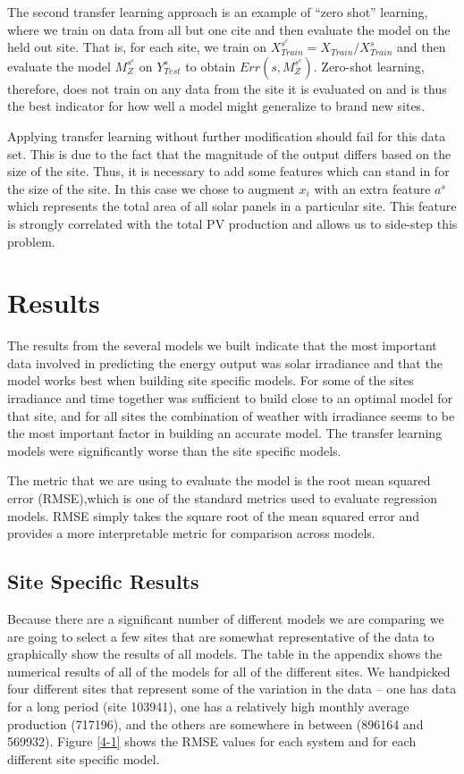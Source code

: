 \documentclass[11pt, fullpage,letterpaper]{article}
\begin{document}
The second transfer learning approach is an example of “zero shot” learning, where we train on data from all but one cite and then evaluate the model on the held out site. That is, for each site, we train on $X^{s^c}_{Train} = X_{Train} / X^s_{Train}$ and then evaluate the model $M^{s^c}_Z$ on $Y^s_{Test}$ to obtain $Err(s, M^{s^c}_Z)$. Zero-shot learning, therefore, does not train on any data from the site it is evaluated on and is thus the best indicator for how well a model might generalize to brand new sites.

Applying transfer learning without further modification should fail for this data set. This is due to the fact that the magnitude of the output differs based on the size of the site. Thus, it is necessary to add some features which can stand in for the size of the site. In this case we chose to augment $x_i$ with an extra feature $a^s$ which represents the total area of all solar panels in a particular site. This feature is strongly correlated with the total PV production and allows us to side-step this problem.

\section{Results}

The results from the several models we built indicate that the most important data involved in predicting the energy output was solar irradiance and that the model works best when building site specific models. For some of the sites irradiance and time together was sufficient to build close to an optimal model for that site, and for all sites the combination of weather with irradiance seems to be the most important factor in building an accurate model. The transfer learning models were significantly worse than the site specific models.

The metric that we are using to evaluate the model is the root mean squared error (RMSE),which is one of the standard metrics used to evaluate regression models. RMSE simply takes the square root of the mean squared error and provides a more interpretable metric for comparison across models.

\subsection{Site Specific Results}

Because there are a significant number of different models we are comparing we are going to select a few sites that are somewhat representative of the data to graphically show the results of all models. The table in the appendix shows the numerical results of all of the models for all of the different sites. We handpicked four different sites that represent some of the variation in the data – one has data for a long period (site 103941), one has a relatively high monthly average production (717196), and the others are somewhere in between (896164 and 569932). Figure \ref{4-1} shows the RMSE values for each system and for each different site specific model. 
\end{document}
